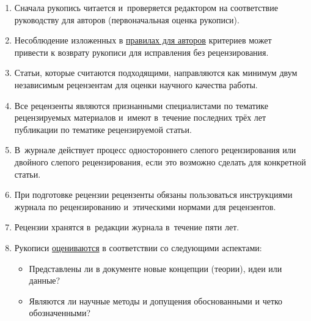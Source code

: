 \begin{enumerate}



\item[1.] Сначала рукопись читается и~проверяется редактором на соответствие руководству для авторов (первоначальная оценка рукописи).



\item[2.]  Несоблюдение изложенных в \href{http://www.mathnet.ru/rus/vsgtu/authornotes#manuscriptPreparingRequirements}{правилах для авторов} критериев может привести к возврату рукописи для исправления без рецензирования.



\item[3.]  Статьи, которые считаются подходящими, направляются как минимум двум независимым рецензентам для оценки научного качества работы.



\item[4.]  Все рецензенты являются признанными специалистами по тематике рецензируемых материалов и~имеют в~течение последних трёх лет публикации по тематике рецензируемой статьи.



\item[5.]  В~журнале действует процесс одностороннего слепого рецензирования или двойного слепого рецензирования, если это возможно сделать для конкретной статьи.



\item[6.] При подготовке рецензии рецензенты обязаны пользоваться инструкциями журнала по рецензированию и~этическими нормами для рецензентов. 



\item[7.] Рецензии хранятся в~редакции журнала в~течение пяти лет.



\item[8.] Рукописи \href{https://goo.gl/wDhKbS}{оцениваются} в соответствии со следующими аспектами:

\begin{itemize}

\item Представлены ли в документе новые концепции (теории), идеи или данные? 

\item Являются ли научные методы и допущения обоснованными и четко обозначенными? 


\end{itemize}
\end{enumerate}
